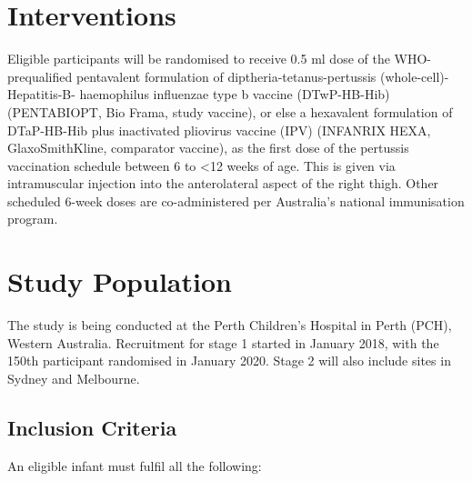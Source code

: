 \documentclass{bmcart}
\begin{document}
\section*{Interventions}

Eligible participants will be randomised to receive 0.5 ml dose of the WHO-prequalified pentavalent formulation of diptheria-tetanus-pertussis (whole-cell)-Hepatitis-B- haemophilus influenzae type b vaccine (DTwP-HB-Hib) (PENTABIO\textregistered PT, Bio Frama, study vaccine), or else a hexavalent formulation of DTaP-HB-Hib plus inactivated pliovirus vaccine (IPV) (INFANRIX HEXA\textregistered, GlaxoSmithKline, comparator vaccine), as the first dose of the pertussis vaccination schedule between 6 to \textless 12 weeks of age.
This is given via intramuscular injection into the anterolateral aspect of the right thigh.
Other scheduled 6-week doses are co-administered per Australia's national immunisation program.

\section*{Study Population}

The study is being conducted at the Perth Children's Hospital in Perth (PCH), Western Australia.
Recruitment for stage 1 started in January 2018, with the 150th participant randomised in January 2020.
Stage 2 will also include sites in Sydney and Melbourne.

\subsection*{Inclusion Criteria}

An eligible infant must fulfil all the following:
\end{document}

